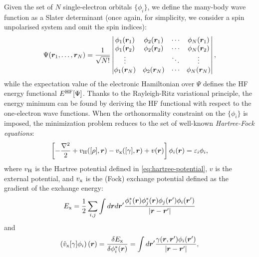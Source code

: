 Given the set of $N$ single-electron orbitals $\{ \phi_i \}$, we define the many-body wave function as a Slater determinant (once again, for simplicity, we consider a spin unpolarised system and omit the spin indices):
%
\begin{equation}
    \Psi({\bm r}_1, \dots, {\bm r}_N) = \frac{1}{\sqrt{N!}}
    \begin{vmatrix}
        \phi_1({\bm r}_1) & \phi_2({\bm r}_1) & \cdots & \phi_N({\bm r}_1) \\
        \phi_1({\bm r}_2) & \phi_2({\bm r}_2) & \cdots & \phi_N({\bm r}_2) \\
        \vdots & & \ddots & \vdots \\
        \phi_1({\bm r}_N) & \phi_2({\bm r}_N) & \cdots & \phi_N({\bm r}_N)
    \end{vmatrix} ,
    \label{eq:slater-determinant}
\end{equation}
%
while the expectation value of the electronic Hamiltonian over $\Psi$ defines the HF energy functional $E^{\rm HF}[\Psi]$. Thanks to the Rayleigh-Ritz variational principle, the energy minimum can be found by deriving the HF functional with respect to the one-electron wave functions. When the orthonormality constraint on the $\{ \phi_i \}$ is imposed, the minimization problem reduces to the set of well-known \emph{Hartree-Fock equations}:
%
\begin{equation}
    \left[ -\frac{\nabla^2}{2} + v_{\rm H}([\rho],{\bm r}) - v_{\rm x}([\gamma],{\bm r}) + v({\bm r}) \right] \phi_i({\bm r}) = \varepsilon_i \phi_i ,
    \label{eq:hf-equations}
\end{equation}
%
where $v_{\rm H}$ is the Hartree potential defined in \cref{eq:hartree-potential}, $v$ is the external potential, and $v_{\rm x}$ is the (Fock) exchange potential defined as the gradient of the exchange energy:
%
\begin{equation}
    E_{\rm x} = \frac{1}{2} \sum_{i,j} \int d{\bm r} d{\bm r}' \frac{\phi_i^*({\bm r})\phi_j^*({\bm r})\phi_j({\bm r}')\phi_i({\bm r}')}{|{\bm r}-{\bm r}'|}
    \label{eq:fock-exchange-energy}
\end{equation}
%
and
%
\begin{equation}
    \left( \hat{v}_{\rm x}[\gamma] \phi_i \right)({\bm r}) = \frac{\delta E_{\rm x}}{\delta \phi_i^*({\bm r})} = \int d{\bm r}' \frac{\gamma({\bm r},{\bm r}') \phi_i({\bm r}')}{|{\bm r}-{\bm r}'|} ,
    \label{eq:fock-exchange-potential}
\end{equation}
%
